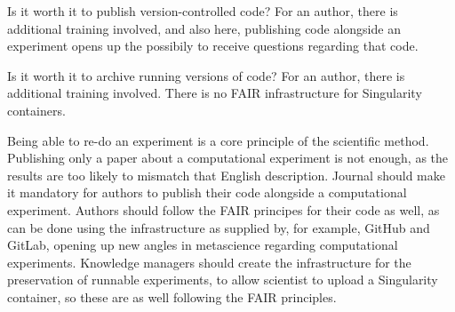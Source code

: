 
Is it worth it to publish version-controlled code?
For an author, 
there is additional training involved, and also here,
publishing code alongside an experiment opens up
the possibily to receive questions regarding that code.


Is it worth it to archive running versions of code?
For an author, 
there is additional training involved.
There is no FAIR infrastructure for Singularity containers.



Being able to re-do an experiment is a core principle of the scientific method.
Publishing only a paper about a computational experiment is not enough,
as the results are too likely to mismatch that English description.
Journal should make it mandatory for authors
to publish their code alongside a computational experiment.
Authors should follow the FAIR principes for their code as well,
as can be done using the infrastructure as supplied by, 
for example, GitHub and GitLab, opening up new angles in
metascience regarding computational experiments.
Knowledge managers should create the infrastructure for the preservation
of runnable experiments, to allow scientist to upload a Singularity
container, so these are as well following the FAIR principles.


